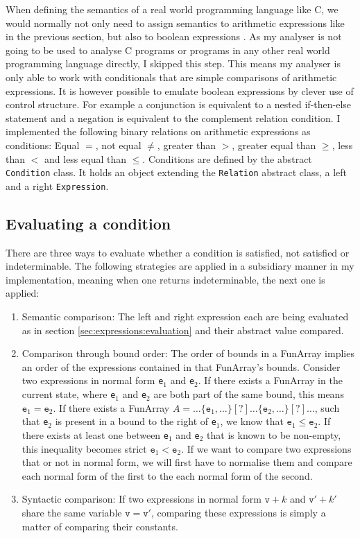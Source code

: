 When defining the semantics of a real world programming language like C, we would normally not only need to assign semantics to arithmetic expressions like in the previous section, but also to boolean expressions \cite{scott1971}. As my analyser is not going to be used to analyse C programs or programs in any other real world programming language directly, I skipped this step. This means my analyser is only able to work with conditionals that are simple comparisons of arithmetic expressions. It is however possible to emulate boolean expressions by clever use of control structure. For example a conjunction is equivalent to a nested if-then-else statement and a negation is equivalent to the complement relation condition. I implemented the following binary relations on arithmetic expressions as conditions: Equal $=$, not equal $\neq$, greater than $>$, greater equal than $\geq$, less than $<$ and less equal than $\leq$. Conditions are defined by the abstract \texttt{Condition} class. It holds an object extending the \texttt{Relation} abstract class, a left and a right \texttt{Expression}.

\subsection{Evaluating a condition}

There are three ways to evaluate whether a condition is satisfied, not satisfied or indeterminable. The following strategies are applied in a subsidiary manner in my implementation, meaning when one returns indeterminable, the next one is applied:

\begin{enumerate}
	\item Semantic comparison: The left and right expression each are being evaluated as in section \ref{sec:expressions:evaluation} and their abstract value compared. 
	\item Comparison through bound order: The order of bounds in a FunArray implies an order of the expressions contained in that FunArray's bounds. Consider two expressions in normal form \texttt{e}$_1$ and \texttt{e}$_2$. If there exists a FunArray in the current state, where \texttt{e}$_1$ and \texttt{e}$_2$ are both part of the same bound, this means $\mathtt{e}_1=\mathtt{e}_2$. If there exists a FunArray $A=\ldots\{\mathtt{e}_1,\ldots\}[?]\ldots\{\mathtt{e}_2,\ldots\}[?]\ldots $, such that \texttt{e}$_2$ is present in a bound to the right of \texttt{e}$_1$, we know that $\mathtt{e}_1\leq\mathtt{e}_2$. If there exists at least one between \texttt{e}$_1$ and \texttt{e}$_2$ that is known to be non-empty, this inequality becomes strict $\mathtt{e}_1<\mathtt{e}_2$. If we want to compare two expressions that or not in normal form, we will first have to normalise them and compare each normal form of the first to the each normal form of the second.
	\item Syntactic comparison: If two expressions in normal form $\mathtt{v}+k$ and $\mathtt{v}'+k'$ share the same variable $\mathtt{v}=\mathtt{v}'$, comparing these expressions is simply a matter of comparing their constants.
\end{enumerate}

